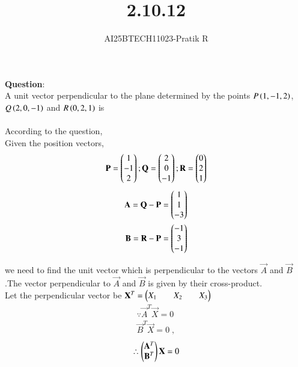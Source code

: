 \documentclass[journal]{IEEEtran}
\begin{document}

\vspace{3cm}

\title{2.10.12}
\author{AI25BTECH11023-Pratik R}
 \maketitle
{\let\newpage\relax\maketitle}

\renewcommand{\thefigure}{\theenumi}
\renewcommand{\thetable}{\theenumi}
\setlength{\intextsep}{10pt} %


\renewcommand{\thetable}{\theenumi}

\textbf{Question}:\\
A unit vector perpendicular to the plane determined by the points
$P\left(1,-1,2\right)$,$Q\left(2,0,-1\right)$ and $R\left(0,2,1\right)$ is \\ 
\solution \\
According to the question, \\
Given the position vectors,
\begin{align}
    \mathbf{P}=\begin{pmatrix}1\\-1\\2\end{pmatrix};
    \mathbf{Q}=\begin{pmatrix}2\\0\\-1\end{pmatrix};
    \mathbf{R}=\begin{pmatrix}0\\2\\1\end{pmatrix}
\end{align}
\begin{align}
    \mathbf{A}= \mathbf{Q}-\mathbf{P} = \begin{pmatrix}1\\1\\-3\end{pmatrix}\\
    \mathbf B = \mathbf{R}-\mathbf{P} = \begin{pmatrix}-1\\3\\-1\end{pmatrix}
\end{align}

we need to find the unit vector which is perpendicular to the vectors $\vec{A}$ and $\vec{B}$.The vector perpendicular to $\vec{A}$ and $\vec{B}$ is given by their cross-product.\\
Let the perpendicular vector be $\mathbf{X}^T=\begin{pmatrix}X_1&&X_2&&X_3\end{pmatrix}$
\begin{align}
    \because \vec{A}^T\vec{X}=0\\
    \vec{B}^T\vec{X}=0\;,
\end{align}
\begin{align}
    \therefore \begin{pmatrix}\mathbf{A}^T\\\mathbf{B}^T\end{pmatrix}\mathbf{X}=0
\end{align}
\end{document}
